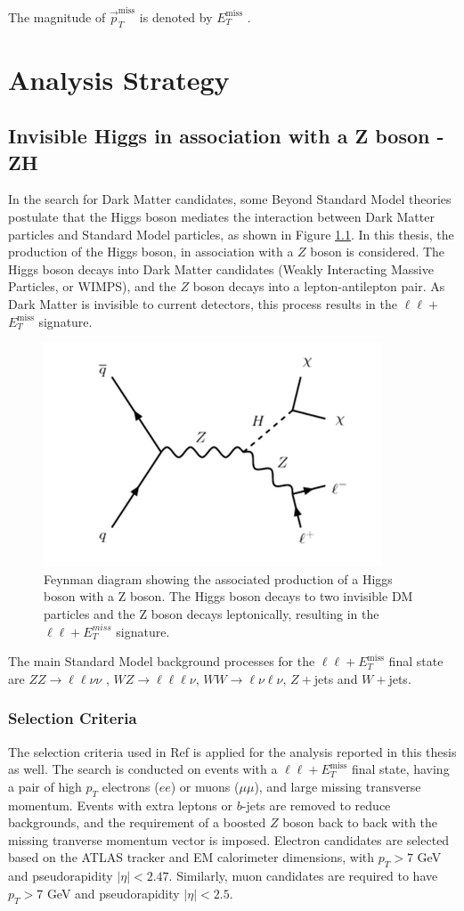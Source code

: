 \documentclass[11pt,a4paper,openright,twoside]{report}
\newcommand{\ZZ}{$ZZ\to \ell\ell\nu\nu$ }
\newcommand{\met}{$E_T^{\mathrm{miss}}$ }
\begin{document}
The magnitude of $\vec{p}_T^{\mathrm{miss}}$ is denoted by \met.

\chapter{Analysis Strategy}\label{ch:theory}
\section{Invisible Higgs in association with a Z boson - ZH}
In the search for Dark Matter candidates, some Beyond Standard Model theories postulate that the Higgs boson mediates the interaction between Dark Matter particles and Standard Model particles, as shown in Figure \ref{fig:HZ}. In this thesis, the production of the Higgs boson, in association with a $Z$ boson is considered. The Higgs boson decays into Dark Matter candidates (Weakly Interacting Massive Particles, or WIMPS), and the $Z$ boson decays into a lepton-antilepton pair. As Dark Matter is invisible to current detectors, this process results in the $\ell\ell+$\met signature.
\begin{figure}[H]
\centering
	\includegraphics[width=0.5\linewidth]{HZ.png}
	\caption{Feynman diagram showing the associated production of a Higgs boson with a Z boson. The Higgs boson decays to two invisible DM particles and the Z boson decays leptonically, resulting in the $\ell\ell+ E_T^{miss}$ signature.}
		\label{fig:HZ}
\end{figure}
The main Standard Model background processes for the $\ell\ell+$\met final state are \ZZ, $WZ\to \ell\ell\ell\nu$, $WW\to \ell\nu \ell\nu$, $Z+$jets and $W+$jets. 

\subsection{Selection Criteria}
The selection criteria used in Ref \cite{ZH_ATLAS} is applied for the analysis reported in this thesis as well. The search is conducted on events with a $\ell\ell+$\met final state, having a pair of high $p_T$ electrons ($ee$) or muons ($\mu\mu$), and large missing transverse momentum. Events with extra leptons or $b$-jets are removed to reduce backgrounds, and the requirement of a boosted $Z$ boson back to back with the missing tranverse momentum vector is imposed. Electron candidates are selected based on the ATLAS tracker and EM calorimeter dimensions, with $p_T > 7$ GeV and pseudorapidity $|\eta| < 2.47$. Similarly, muon candidates are required to have $p_T > 7$ GeV and pseudorapidity $|\eta| < 2.5$.
\end{document}
